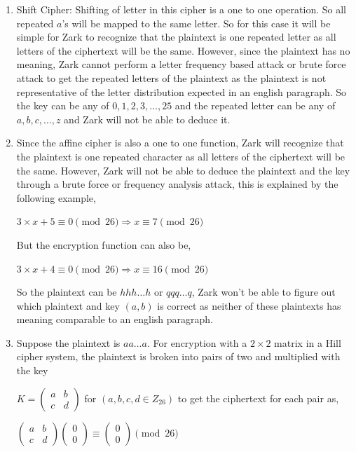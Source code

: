 \documentclass{ashoka-crypto}
\begin{document}
\begin{enumerate}[label=(\alph*)]
\item Shift Cipher:
Shifting of letter in this cipher is a one to one operation. So all repeated $a$'s will be mapped to the same letter. So for this case it will be simple for Zark to recognize that the plaintext is one repeated letter as all letters of the ciphertext will be the same. However, since the plaintext has no meaning, Zark cannot perform a letter frequency based attack or brute force attack to get the repeated letters of the plaintext as the plaintext is not representative of the letter distribution expected in an english paragraph. So the key can be any of $0,1,2,3,\dots,25$ and the repeated letter can be any of $a,b,c,\dots,z$ and Zark will not be able to deduce it.
\item Since the affine cipher is also a one to one function, Zark will recognize that the plaintext is one repeated character as all letters of the ciphertext will be the same. However, Zark will not be able to deduce the plaintext and the key through a brute force or frequency analysis attack, this is explained by the following example,

\begin{math}
3 \times x + 5 \equiv 0 \pmod{26} \Rightarrow x \equiv 7 \pmod {26}
\end{math}

But the encryption function can also be,

\begin{math}
3 \times x + 4 \equiv 0 \pmod{26} \Rightarrow x \equiv 16 \pmod {26}
\end{math}

So the plaintext can be $hhh\dots h$ or $qqq\dots q$, Zark won't be able to figure out which plaintext and key $(a,b)$ is correct as neither of these plaintexts has meaning comparable to an english paragraph.

\item Suppose the plaintext is $aa \dots a$. For encryption with a $2 \times 2$ matrix in a Hill cipher system, the plaintext is broken into pairs of two and multiplied with the key

$K = \begin{pmatrix}
a & b \\
c & d
\end{pmatrix}$ for $(a,b,c,d \in Z_{26})$ to get the ciphertext for each pair as,

\begin{center}
\begin{math}
\begin{pmatrix}
a & b \\
c & d
\end{pmatrix}
\begin{pmatrix}
0\\
0
\end{pmatrix}
\equiv 
\begin{pmatrix}
0\\
0
\end{pmatrix}
\pmod{26}
\end{math}
\end{center}


\end{enumerate}
\end{document}
